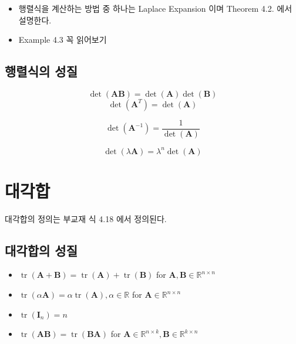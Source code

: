 \documentclass[
  11pt,
  a4paper,
  oneside]{scrbook}
\providecommand{\tightlist}{%
  \setlength{\itemsep}{0pt}\setlength{\parskip}{0pt}}\usepackage{longtable,booktabs,array}
\theoremstyle{definition}
\theoremstyle{definition}
\theoremstyle{plain}
\theoremstyle{remark}
\begin{document}
\begin{itemize}
\tightlist
\item
  행렬식을 계산하는 방법 중 하나는 Laplace Expansion 이며 Theorem 4.2.
  에서 설명한다.
\item
  Example 4.3 꼭 읽어보기
\end{itemize}

\subsection{행렬식의 성질}\label{uxd589uxb82cuxc2dduxc758-uxc131uxc9c8}

\[ 
\operatorname{det}(\boldsymbol{A} \boldsymbol{B}) = \operatorname{det}(\boldsymbol{A}) \operatorname{det}(\boldsymbol{B})
\] \[ 
\operatorname{det}(\boldsymbol{A}^T) = \operatorname{det}(\boldsymbol{A})
\]

\[ 
\operatorname{det}(\boldsymbol{A}^{-1}) = \frac{1}{\operatorname{det}(\boldsymbol{A})}
\]

\[ 
\operatorname{det}(\lambda \boldsymbol{A}) = \lambda^n \operatorname{det}(\boldsymbol{A})
\]

\section{대각합}\label{uxb300uxac01uxd569}

대각합의 정의는 부교재 식 4.18 에서 정의된다.

\subsection{대각합의 성질}\label{uxb300uxac01uxd569uxc758-uxc131uxc9c8}

\begin{itemize}
\item
  \(\operatorname{tr}(\boldsymbol{A}+\boldsymbol{B})=\operatorname{tr}(\boldsymbol{A})+\operatorname{tr}(\boldsymbol{B})\)
  for \(\boldsymbol{A}, \boldsymbol{B} \in \mathbb{R}^{n \times n}\)
\item
  \(\operatorname{tr}(\alpha \boldsymbol{A})=\alpha \operatorname{tr}(\boldsymbol{A}), \alpha \in \mathbb{R}\)
  for \(\boldsymbol{A} \in \mathbb{R}^{n \times n}\)
\item
  \(\operatorname{tr}\left(\boldsymbol{I}_n\right)=n\)
\item
  \(\operatorname{tr}(\boldsymbol{A B})=\operatorname{tr}(\boldsymbol{B} \boldsymbol{A})\)
  for
  \(\boldsymbol{A} \in \mathbb{R}^{n \times k}, \boldsymbol{B} \in \mathbb{R}^{k \times n}\)
\end{itemize}
\end{document}
